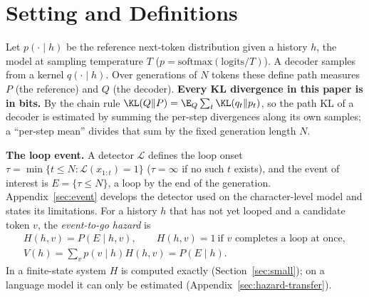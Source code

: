 \section{Setting and Definitions}\label{sec:setup}

Let $p(\cdot\mid h)$ be the reference next-token distribution given a history $h$, the model at sampling temperature $T$ ($p=\mathrm{softmax}(\mathrm{logits}/T)$). A decoder samples from a kernel $q(\cdot\mid h)$. Over generations of $N$ tokens these define path measures $P$ (the reference) and $Q$ (the decoder). \textbf{Every KL divergence in this paper is in bits.} By the chain rule $\KL(Q\Vert P)=\E_Q\sum_t \KL(q_t\Vert p_t)$, so the path KL of a decoder is estimated by summing the per-step divergences along its own samples; a ``per-step mean'' divides that sum by the fixed generation length $N$.

\textbf{The loop event.} A detector $\mathcal{L}$ defines the loop onset $\tau=\min\{t\le N:\mathcal{L}(x_{1:t})=1\}$ ($\tau=\infty$ if no such $t$ exists), and the event of interest is $E=\{\tau\le N\}$, a loop by the end of the generation. Appendix~\ref{sec:event} develops the detector used on the character-level model and states its limitations. For a history $h$ that has not yet looped and a candidate token $v$, the \emph{event-to-go hazard} is
\begin{gather*}
H(h,v)=P(E\mid h,v),\qquad H(h,v)=1\ \text{if $v$ completes a loop at once},\\
V(h)=\textstyle\sum_v p(v\mid h)H(h,v)=P(E\mid h).
\end{gather*}
In a finite-state system $H$ is computed exactly (Section~\ref{sec:small}); on a language model it can only be estimated (Appendix~\ref{sec:hazard-transfer}).

